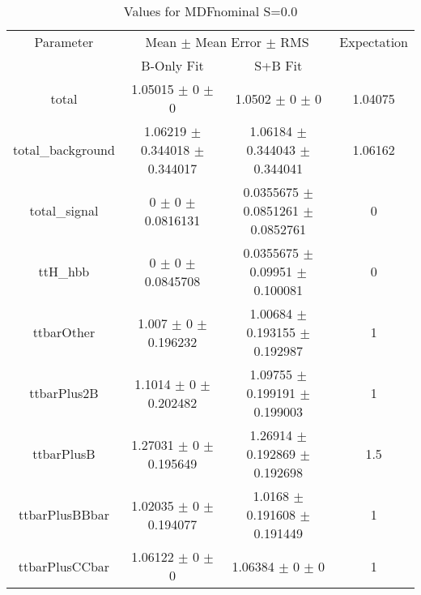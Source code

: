 \begin{table}
\centering
\caption{Values for MDFnominal S=0.0}
\begin{tabular}{cccc}
\toprule
Parameter & \multicolumn{2}{c}{Mean $\pm$ Mean Error $\pm$ RMS} & Expectation\\
 & B-Only Fit & S+B Fit & \\
\midrule
total & \num{1.05015} $\pm$ \num{0} $\pm$ \num{0} & \num{1.0502} $\pm$ \num{0} $\pm$ \num{0} & \num{1.04075}\\
total\_background & \num{1.06219} $\pm$ \num{0.344018} $\pm$ \num{0.344017} & \num{1.06184} $\pm$ \num{0.344043} $\pm$ \num{0.344041} & \num{1.06162}\\
total\_signal & \num{0} $\pm$ \num{0} $\pm$ \num{0.0816131} & \num{0.0355675} $\pm$ \num{0.0851261} $\pm$ \num{0.0852761} & \num{0}\\
ttH\_hbb & \num{0} $\pm$ \num{0} $\pm$ \num{0.0845708} & \num{0.0355675} $\pm$ \num{0.09951} $\pm$ \num{0.100081} & \num{0}\\
ttbarOther & \num{1.007} $\pm$ \num{0} $\pm$ \num{0.196232} & \num{1.00684} $\pm$ \num{0.193155} $\pm$ \num{0.192987} & \num{1}\\
ttbarPlus2B & \num{1.1014} $\pm$ \num{0} $\pm$ \num{0.202482} & \num{1.09755} $\pm$ \num{0.199191} $\pm$ \num{0.199003} & \num{1}\\
ttbarPlusB & \num{1.27031} $\pm$ \num{0} $\pm$ \num{0.195649} & \num{1.26914} $\pm$ \num{0.192869} $\pm$ \num{0.192698} & \num{1.5}\\
ttbarPlusBBbar & \num{1.02035} $\pm$ \num{0} $\pm$ \num{0.194077} & \num{1.0168} $\pm$ \num{0.191608} $\pm$ \num{0.191449} & \num{1}\\
ttbarPlusCCbar & \num{1.06122} $\pm$ \num{0} $\pm$ \num{0} & \num{1.06384} $\pm$ \num{0} $\pm$ \num{0} & \num{1}\\
\bottomrule
\end{tabular}
\end{table}